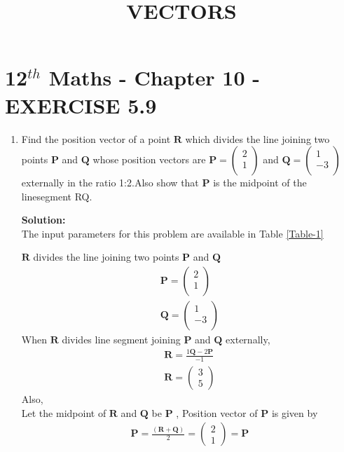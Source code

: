 \documentclass[12pt]{article}
\let\vec\mathbf
\newcommand{\solution}{\noindent \textbf{Solution: }}
\newcommand{\myvec}[1]{\ensuremath{\begin{pmatrix}#1\end{pmatrix}}}
\let\vec\mathbf{}
\begin{document}
\begin{center}
\title{\textbf{VECTORS}}
\date{\vspace{-5ex}} %
\maketitle
\end{center}
\setcounter{page}{1}
\section*{12$^{th}$ Maths - Chapter 10 - EXERCISE 5.9}

\begin{enumerate}

	\item Find the position vector of a point $\vec{R}$ which divides the line joining two points $\vec{ P}$ and $\vec{Q}$ whose position vectors are $\vec{P} = \myvec{2\\ 1 \\}$ and $\vec{Q} = \myvec{ 1\\-3\\ }$  externally in the ratio 1:2.Also show that $\vec{P}$ is the midpoint of the linesegment RQ.

\solution \\The input parameters for this problem are available in Table \ref{Table-1}
\begin{table}[ht!]

\caption{}
\label{Table-1}	
\end{table}
	
$\vec{R}$ divides the line joining two points $\vec{P}$ and $\vec{Q}$ 
\begin{align}
\vec{P} = \myvec{ 2\\1\\}
\label{eq:eq:1} \\
\vec{Q} = \myvec{ 1\\-3\\}
\end{align}
When $\vec{R}$ divides line segment joining $\vec{P}$ and $\vec{Q}$ externally,
\begin{align}
	\vec{R} = \frac{1\vec{Q}-2\vec{P}}{-1}\\
	\vec{R} = \myvec{3\\5}
\end{align}	
Also,\\
		Let the midpoint of $\vec{R}$ and $\vec{Q}$ be $\vec{P}$ , Position vector of $\vec{P}$ is given by
\begin{align}
	\vec{P}=\frac{(\vec{R} + \vec{Q})}{2} 
	=\myvec{2\\1}=\vec{P}
	\label{eq:eq:5}
\end{align}
		

\end{enumerate}
\end{document}
